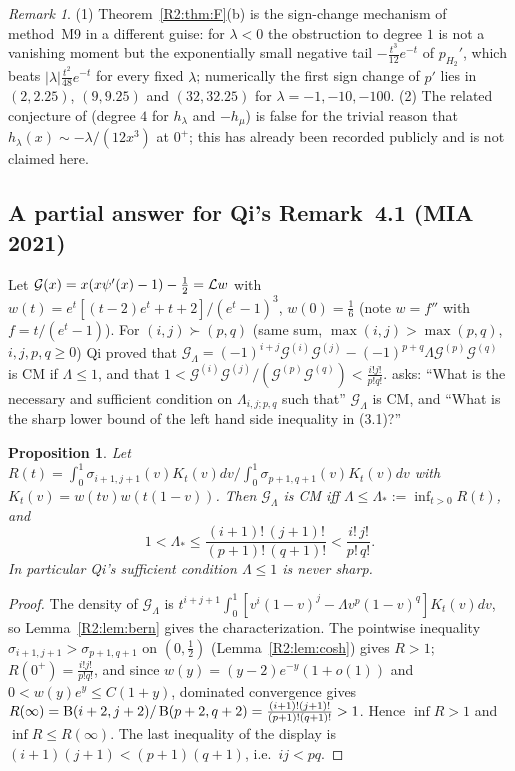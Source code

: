 \documentclass[11pt]{amsart}
\newtheorem{proposition}[theorem]{Proposition}
\theoremstyle{definition}
\theoremstyle{remark}
\newtheorem{remark}[theorem]{Remark}
\begin{document}
\begin{remark}\label{R2:rem:EF}
(1) Theorem~\ref{R2:thm:F}(b) is the sign-change mechanism of method~M9 in a
different guise: for $\lambda<0$ the obstruction to degree $1$ is not a
vanishing moment but the exponentially small negative tail
$-\frac{t^3}{12}e^{-t}$ of $p_{H_2}'$, which beats $|\lambda|\frac{t^2}{48}e^{-t}$
for every fixed $\lambda$; numerically the first sign change of $p'$ lies in
$(2,2.25)$, $(9,9.25)$ and $(32,32.25)$ for $\lambda=-1,-10,-100$.
(2) The related conjecture of \cite[Remark~7.4]{R2-QiAIMS2020} (degree $4$ for
$h_\lambda$ and $-h_\mu$) is false for the trivial reason that
$h_\lambda(x)\sim-\lambda/(12x^3)$ at $0^+$; this has already been recorded
publicly \cite{R2-Pudim} and is not claimed here.
\end{remark}

\subsection{A partial answer for Qi's Remark~4.1 (MIA 2021)}
\label{R2:subsec:G}

Let $\mathcal G(x)=x(x\psi'(x)-1)-\frac12=\mathcal{L} w$ with
$w(t)=e^t[(t-2)e^t+t+2]/(e^t-1)^3$, $w(0)=\frac16$ (note $w=f''$ with
$f=t/(e^t-1)$). For $(i,j)\succ(p,q)$ (same sum, $\max(i,j)>\max(p,q)$,
$i,j,p,q\ge0$) Qi \cite[Thm.~3.1]{R2-QiMIA2021} proved that
$\mathcal G_\Lambda=(-1)^{i+j}\mathcal G^{(i)}\mathcal G^{(j)}-(-1)^{p+q}\Lambda\mathcal G^{(p)}\mathcal G^{(q)}$
is CM if $\Lambda\le1$, and that
$1<\mathcal G^{(i)}\mathcal G^{(j)}/(\mathcal G^{(p)}\mathcal G^{(q)})<\frac{i!j!}{p!q!}$.
\cite[Remark~4.1]{R2-QiMIA2021} asks: ``What is the necessary and sufficient
condition on $\Lambda_{i,j;p,q}$ such that'' $\mathcal G_\Lambda$ is CM, and
``What is the sharp lower bound of the left hand side inequality in (3.1)?''

\begin{proposition}\label{R2:prop:G}
Let $R(t)=\int_0^1\sigma_{i+1,j+1}(v)K_t(v)dv\big/\int_0^1\sigma_{p+1,q+1}(v)K_t(v)dv$
with $K_t(v)=w(tv)w(t(1-v))$. Then $\mathcal G_\Lambda$ is CM iff
$\Lambda\le\Lambda_*:=\inf_{t>0}R(t)$, and
\[
 1<\Lambda_*\le\frac{(i+1)!\,(j+1)!}{(p+1)!\,(q+1)!}<\frac{i!\,j!}{p!\,q!}.
\]
In particular Qi's sufficient condition $\Lambda\le1$ is never sharp.
\end{proposition}
\begin{proof}
The density of $\mathcal G_\Lambda$ is
$t^{i+j+1}\int_0^1[v^i(1-v)^j-\Lambda v^p(1-v)^q]K_t(v)dv$, so
Lemma~\ref{R2:lem:bern} gives the characterization. The pointwise inequality
$\sigma_{i+1,j+1}>\sigma_{p+1,q+1}$ on $(0,\frac12)$ (Lemma~\ref{R2:lem:cosh})
gives $R>1$; $R(0^+)=\frac{i!j!}{p!q!}$, and since $w(y)=(y-2)e^{-y}(1+o(1))$
and $0<w(y)e^{y}\le C(1+y)$, dominated convergence gives
$R(\infty)=\operatorname{B}(i+2,j+2)/\operatorname{B}(p+2,q+2)=\frac{(i+1)!(j+1)!}{(p+1)!(q+1)!}>1$.
Hence $\inf R>1$ and $\inf R\le R(\infty)$. The last inequality of the
display is $(i+1)(j+1)<(p+1)(q+1)$, i.e.\ $ij<pq$.
\end{proof}
\end{document}
